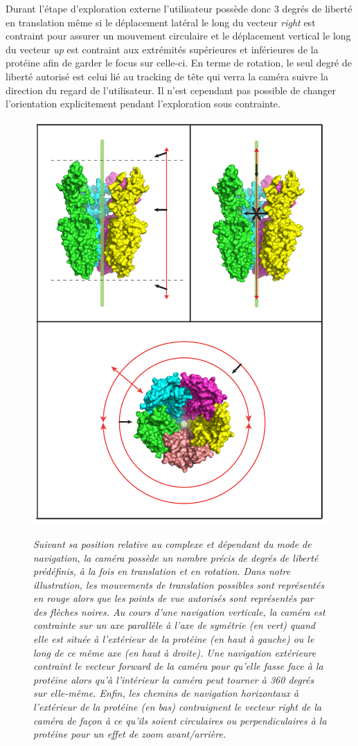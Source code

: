 Durant l'étape d'exploration externe l'utilisateur possède donc 3 degrés de liberté en translation même si le déplacement latéral le long du vecteur \textit{right} est contraint pour assurer un mouvement circulaire et le déplacement vertical le long du vecteur \textit{up} est contraint aux extrémités supérieures et inférieures de la protéine afin de garder le focus sur celle-ci. En terme de rotation, le seul degré de liberté autorisé est celui lié au tracking de tête qui verra la caméra suivre la direction du regard de l'utilisateur. Il n'est cependant pas possible de changer l'orientation explicitement pendant l'exploration sous contrainte.

\begin{figure}[h]
  \centering
  {\includegraphics[width=.5\linewidth]{./figures/ch3/degree_of_freedom_glic}}
    \caption[Représentation des chemins de navigation générés en exploration externe et interne d'un complexe moléculaire.]{{\it Suivant sa position relative au complexe et dépendant du mode de navigation, la caméra possède un nombre précis de degrés de liberté prédéfinis, à la fois en translation et en rotation. Dans notre illustration, les mouvements de translation possibles sont représentés en rouge alors que les points de vue autorisés sont représentés par des flèches noires. Au cours d'une navigation verticale, la caméra est contrainte sur un axe parallèle à l'axe de symétrie (en vert) quand elle est située à l'extérieur de la protéine (en haut à gauche) ou le long de ce même axe (en haut à droite). Une navigation extérieure contraint le vecteur forward de la caméra pour qu'elle fasse face à la protéine alors qu'à l'intérieur la caméra peut tourner à 360 degrés sur elle-même. Enfin, les chemins de navigation horizontaux à l'extérieur de la protéine (en bas) contraignent le vecteur right de la caméra de façon à ce qu'ils soient circulaires ou perpendiculaires à la protéine pour un effet de zoom avant/arrière.}}
  \label{Fig:degree_of_freedom_glic}
  \hspace{0.2cm}
\end{figure}

